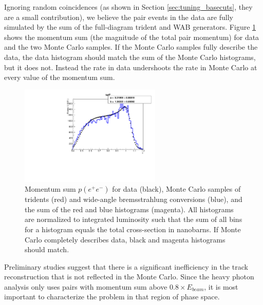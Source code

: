 Ignoring random coincidences (as shown in Section \ref{sec:tuning_basecuts}, they are a small contribution), we believe the pair events in the data are fully simulated by the sum of the full-diagram trident and WAB generators.
Figure \ref{fig:esum_allpairs_uncorr} shows the momentum sum (the magnitude of the total pair momentum) for data and the two Monte Carlo samples.
If the Monte Carlo samples fully describe the data, the data histogram should match the sum of the Monte Carlo histograms, but it does not.
Instead the rate in data undershoots the rate in Monte Carlo at every value of the momentum sum.

\begin{figure}[ht]
\begin{center}
    \includegraphics[width=0.6\textwidth,page=2,angle=-90]{recon/figs/wabratioplots}
\end{center}
    \caption{Momentum sum $p(e^+e^-)$ for data (black), Monte Carlo samples of tridents (red) and wide-angle bremsstrahlung conversions (blue), and the sum of the red and blue histograms (magenta).
    All histograms are normalized to integrated luminosity such that the sum of all bins for a histogram equals the total cross-section in nanobarns.
    If Monte Carlo completely describes data, black and magenta histograms should match.
    }
    \label{fig:esum_allpairs_uncorr}
\end{figure}

Preliminary studies suggest that there is a significant inefficiency in the track reconstruction that is not reflected in the Monte Carlo.
Since the heavy photon analysis only uses pairs with momentum sum above $0.8\times E_{beam}$, it is most important to characterize the problem in that region of phase space.

